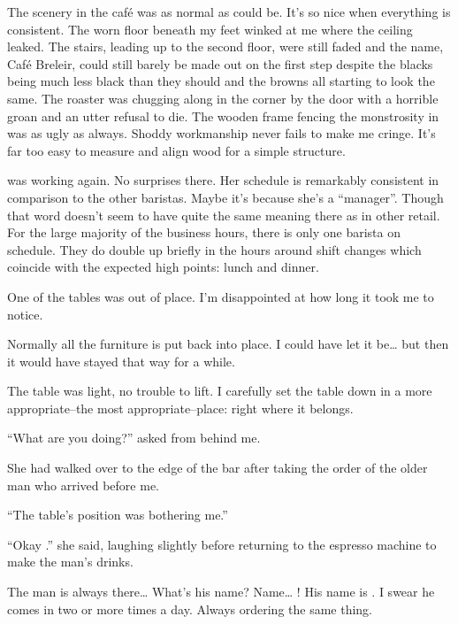 %
\noindent
The scenery in the caf\'e was as normal as could be.
It's so nice when everything is consistent.
The worn floor beneath my feet winked at me where the ceiling leaked.
The stairs, leading up to the second floor, were still faded and the name,
Caf\'e Breleir, could still barely be made out on the first step despite
the blacks being much less black than they should and the browns all
starting to look the same. The roaster was chugging along
in the corner by the door with a horrible groan and an utter refusal to die.
The wooden frame fencing the monstrosity in was as ugly as always.
Shoddy workmanship never fails to make me cringe.
It's far too easy to measure and align wood for a simple structure.


\april{} was working again.  No surprises there.
Her schedule is remarkably consistent in comparison to the other baristas.
Maybe it's because she's a ``manager''.  Though that word doesn't seem to
have quite the same meaning there as in other retail.
For the large majority of the business hours, there is only one barista
on schedule.  They do double up briefly in the hours around shift changes
which coincide with the expected high points: lunch and dinner.


One of the tables was out of place.
I'm disappointed at how long it took me to notice.


Normally all the furniture is put back into place.
I could have let it be\ldots{} but then it would have
stayed that way for a while.


The table was light, no trouble to lift.
I carefully set the table down in a more
appropriate--the most appropriate--place:
right where it belongs.
\VV


``What are you doing?'' \april{} asked from behind me.
\VV


\noindent
She had walked over to the edge of the bar after taking the order
of the older man who arrived before me.
\VV


``The table's position was bothering me.''
\VV


``Okay \josh.'' she said, laughing slightly before returning to
the espresso machine to make the man's drinks.
\VV


\noindent
The man is always there\ldots{} What's his name? Name\ldots{} \dameon!
His name is \dameon. I swear he comes in two or more times a day.
Always ordering the same thing.
\VV


